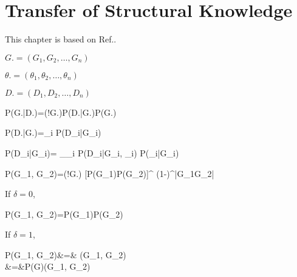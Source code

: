 \chapter{Transfer of Structural Knowledge}
\label{transfer-struc}

This chapter is based on Ref.\cite{nic-transfer}.

$G. = (G_1, G_2, \ldots, G_n)$

$\theta. = (\theta_1, \theta_2, \ldots, \theta_n)$

$D. = (D_1, D_2, \ldots, D_n)$

\beq
P(G.|D.)=\caln(!G.)P(D.|G.)P(G.)
\eeq

\beq
P(D.|G.)=\prod_i P(D_i|G_i)
\eeq

\beq
P(D_i|G_i)=
\sum_{\theta_i}
P(D_i|G_i, \theta_i)
P(\theta_i|G_i)
\eeq

\beq
P(G_1, G_2)=\caln(!G.)
[P(G_1)P(G_2)]^{}
(1-\delta)^{|G_1\Delta G_2|}
\eeq


If $\delta=0$, 

\beq
P(G_1, G_2)=P(G_1)P(G_2)
\eeq

If $\delta=1$,

\beqa
P(G_1, G_2)&=&
\;\delta(G_1, G_2)
\\
&=&P(G)\;\delta(G_1, G_2)
\eeqa